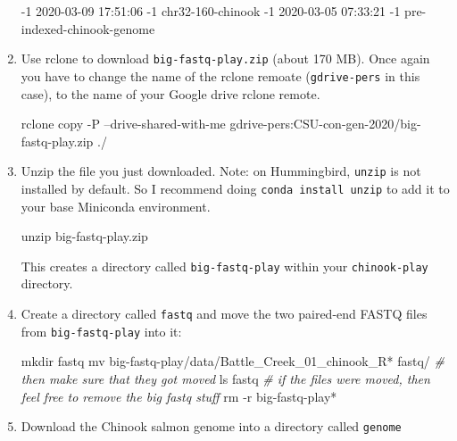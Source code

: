 \documentclass[]{krantz}
\makeatletter
\newenvironment{Shaded}{\begin{snugshade}}{\end{snugshade}}
\newcommand{\CommentTok}[1]{\textcolor[rgb]{0.37,0.37,0.37}{\textit{#1}}}
\newcommand{\ExtensionTok}[1]{#1}
\newcommand{\FunctionTok}[1]{\textcolor[rgb]{0,0,0}{#1}}
\newcommand{\NormalTok}[1]{#1}
\newenvironment{kframe}{%
\medskip{}
\setlength{\fboxsep}{.8em}
 \def\at@end@of@kframe{}%
 \ifinner\ifhmode%
  \def\at@end@of@kframe{\end{minipage}}%
  \begin{minipage}{\columnwidth}%
 \fi\fi%
 \def\FrameCommand##1{\hskip\@totalleftmargin \hskip-\fboxsep
 \colorbox{shadecolor}{##1}\hskip-\fboxsep
     \hskip-\linewidth \hskip-\@totalleftmargin \hskip\columnwidth}%
 \MakeFramed {\advance\hsize-\width
   \@totalleftmargin\z@ \linewidth\hsize
   \@setminipage}}%
 {\par\unskip\endMakeFramed%
 \at@end@of@kframe}
\renewenvironment{Shaded}{\begin{kframe}}{\end{kframe}}
\makeatother
\begin{document}
\begin{enumerate}
\begin{Shaded}
\begin{Highlighting}[]
\ExtensionTok{-1}\NormalTok{ 2020-03-09 17:51:06        -1 chr32-160-chinook}
\ExtensionTok{-1}\NormalTok{ 2020-03-05 07:33:21        -1 pre-indexed-chinook-genome}
\end{Highlighting}
\end{Shaded}
\item
  Use rclone to download \texttt{big-fastq-play.zip} (about 170 MB). Once again you have to change
  the name of the rclone remoate (\texttt{gdrive-pers} in this case), to the name of your Google drive
  rclone remote.

\begin{Shaded}
\begin{Highlighting}[]
\ExtensionTok{rclone}\NormalTok{ copy -P  --drive-shared-with-me gdrive-pers:CSU-con-gen-2020/big-fastq-play.zip ./}
\end{Highlighting}
\end{Shaded}
\item
  Unzip the file you just downloaded. Note: on Hummingbird, \texttt{unzip} is not installed by default.
  So I recommend doing \texttt{conda\ install\ unzip} to add it to your base Miniconda environment.

\begin{Shaded}
\begin{Highlighting}[]
\FunctionTok{unzip}\NormalTok{ big-fastq-play.zip}
\end{Highlighting}
\end{Shaded}

  This creates a directory called \texttt{big-fastq-play} within your \texttt{chinook-play} directory.
\item
  Create a directory called \texttt{fastq} and move the two paired-end FASTQ files from \texttt{big-fastq-play} into it:

\begin{Shaded}
\begin{Highlighting}[]
\FunctionTok{mkdir}\NormalTok{ fastq }
\FunctionTok{mv}\NormalTok{ big-fastq-play/data/Battle_Creek_01_chinook_R* fastq/}
\CommentTok{# then make sure that they got moved}
\FunctionTok{ls}\NormalTok{ fastq}
\CommentTok{# if the files were moved, then feel free to remove the big fastq stuff}
\FunctionTok{rm}\NormalTok{ -r big-fastq-play*}
\end{Highlighting}
\end{Shaded}
\item
  Download the Chinook salmon genome into a directory called \texttt{genome}


\end{enumerate}
\end{document}
